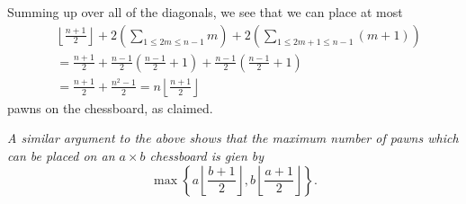 \documentclass{article}
\begin{document}
\begin{enumerate}
{Summing up over all of the diagonals, we see that we can place at most
\begin{align*}
	& \left\lfloor \frac{n + 1}{2} \right\rfloor + 2 \left( \sum_{1 \leq 2m \leq n - 1} m \right) + 2 \left( \sum_{1 \leq 2m + 1 \leq n - 1} (m + 1) \right) \\
	& = \frac{n + 1}{2} + \frac{n - 1}{2} \left( \frac{n - 1}{2} + 1 \right) + \frac{n - 1}{2} \left( \frac{n - 1}{2} + 1 \right) \\
	& = \frac{n + 1}{2} + \frac{n^2 - 1}{2} = n \left\lfloor \frac{n + 1}{2} \right\rfloor
\end{align*}
pawns on the chessboard, as claimed.

\textit{A similar argument to the above shows that the maximum number of pawns which can be placed on an $a \times b$ chessboard is gien by
\[
	\max\left\{ a \left\lfloor \frac{b + 1}{2} \right\rfloor, b \left\lfloor \frac{a + 1}{2} \right\rfloor \right\}.
\]
}}


\end{enumerate}
\end{document}
